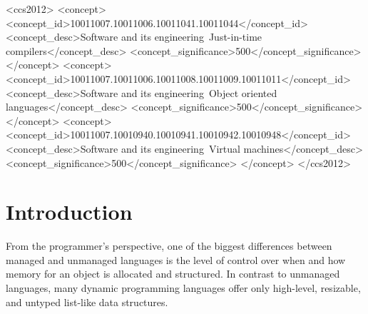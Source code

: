 \documentclass[sigconf, review, balance=false]{acmart}
\begin{document}
\begin{CCSXML}
<ccs2012>
   <concept>
       <concept_id>10011007.10011006.10011041.10011044</concept_id>
       <concept_desc>Software and its engineering~Just-in-time compilers</concept_desc>
       <concept_significance>500</concept_significance>
       </concept>
   <concept>
       <concept_id>10011007.10011006.10011008.10011009.10011011</concept_id>
       <concept_desc>Software and its engineering~Object oriented languages</concept_desc>
       <concept_significance>500</concept_significance>
       </concept>
   <concept>
       <concept_id>10011007.10010940.10010941.10010942.10010948</concept_id>
       <concept_desc>Software and its engineering~Virtual machines</concept_desc>
       <concept_significance>500</concept_significance>
       </concept>
 </ccs2012>
\end{CCSXML}



\maketitle

\section{Introduction}
From the programmer's perspective, one of the biggest differences
between managed and unmanaged languages is the level of control over
when and how memory for an object is allocated and structured. In
contrast to unmanaged languages, many dynamic programming languages
offer only high-level, resizable, and untyped list-like data structures.
\end{document}
